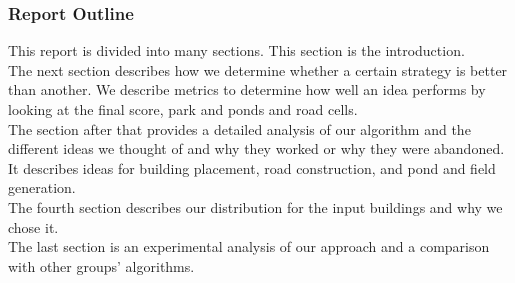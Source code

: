 \subsubsection{Report Outline}
This report is divided into many sections. This section is the introduction.\\ 
The next section describes how we determine whether a certain strategy is better than another. We describe metrics to determine how well an idea performs by looking at the final score, park and ponds and road cells.
\\The section after that provides a detailed analysis of our algorithm and the different ideas we thought of and why they worked or why they were abandoned. It describes ideas for building placement, road construction, and pond and field generation.
\\The fourth section describes our distribution for the input buildings and why we chose it.
\\The last section is an experimental analysis of our approach and a comparison with other groups' algorithms.